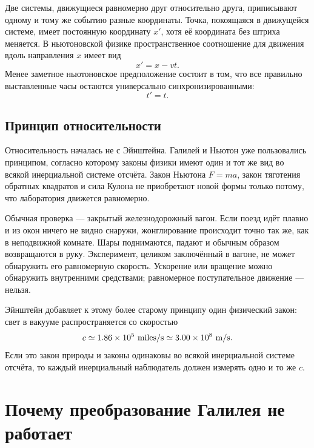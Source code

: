 Две системы, движущиеся равномерно друг относительно друга, приписывают одному и тому же событию разные координаты. Точка, покоящаяся в движущейся системе, имеет постоянную координату \(x'\), хотя её координата без штриха меняется. В ньютоновской физике пространственное соотношение для движения вдоль направления \(x\) имеет вид
\begin{equation}
x'=x-vt.
\label{eq:sr1-galilean-space}
\end{equation}
Менее заметное ньютоновское предположение состоит в том, что все правильно выставленные часы остаются универсально синхронизированными:
\begin{equation}
t'=t.
\label{eq:sr1-absolute-time}
\end{equation}

\subsection{Принцип относительности}

Относительность началась не с Эйнштейна. Галилей и Ньютон уже пользовались принципом, согласно которому законы физики имеют один и тот же вид во всякой инерциальной системе отсчёта. Закон Ньютона \(F=ma\), закон тяготения обратных квадратов и сила Кулона не приобретают новой формы только потому, что лаборатория движется равномерно.

Обычная проверка — закрытый железнодорожный вагон. Если поезд идёт плавно и из окон ничего не видно снаружи, жонглирование происходит точно так же, как в неподвижной комнате. Шары поднимаются, падают и обычным образом возвращаются в руку. Эксперимент, целиком заключённый в вагоне, не может обнаружить его равномерную скорость. Ускорение или вращение можно обнаружить внутренними средствами; равномерное поступательное движение — нельзя.

Эйнштейн добавляет к этому более старому принципу один физический закон: свет в вакууме распространяется со скоростью
\begin{equation}
c \simeq 1.86\times 10^5\ {\rm miles/s}
   \simeq 3.00\times 10^8\ {\rm m/s}.
\end{equation}
Если это закон природы и законы одинаковы во всякой инерциальной системе отсчёта, то каждый инерциальный наблюдатель должен измерять одно и то же \(c\).

\section{Почему преобразование Галилея не работает}

